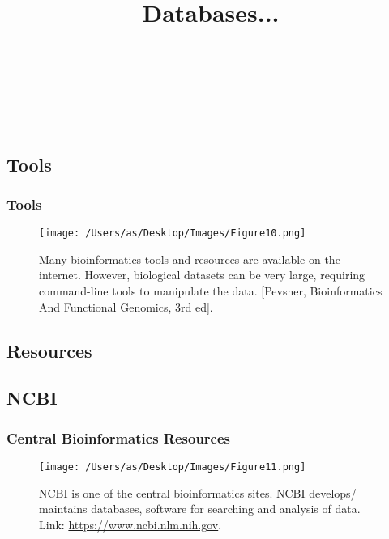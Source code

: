 \documentclass[11pt]{beamer}
\newcommand{\docYear}{\text{2022}} %
\newcommand{\aUthor}{\text{Anjali Silva}}
\newcommand{\courseCodeName}{\text{BCB410H1: Applied Bioinformatics }}
\begin{document}
\subsection{Tools}
\begin{frame}
\frametitle{Tools}
\begin{center}
\begin{figure}
\texttt{[image: /Users/as/Desktop/Images/Figure10.png]}
\caption{Many bioinformatics tools and resources are available on the internet. However, biological datasets can be very large, requiring command-line tools to manipulate the data. [Pevsner, Bioinformatics And Functional Genomics, 3rd ed].}
\end{figure}
\end{center} 
\end{frame}

\title[\courseCodeName\docYear]{Databases...}
\author[\aUthor]{}
\date{\vspace{0.5cm} \\ \\
\\
\\ \vspace{0.5cm} } 

\subsection{Resources}
\begin{frame}
\titlepage
\end{frame}

\subsection{NCBI}
\begin{frame}
\frametitle{Central Bioinformatics Resources}
\begin{center}
\begin{figure}
\texttt{[image: /Users/as/Desktop/Images/Figure11.png]}
\vspace{0.2in}
\caption{NCBI is one of the central bioinformatics sites. NCBI develops/ maintains databases, software for searching and analysis of data. Link: \url{https://www.ncbi.nlm.nih.gov}.}
\end{figure}
\end{center} 
\end{frame}
\end{document}
